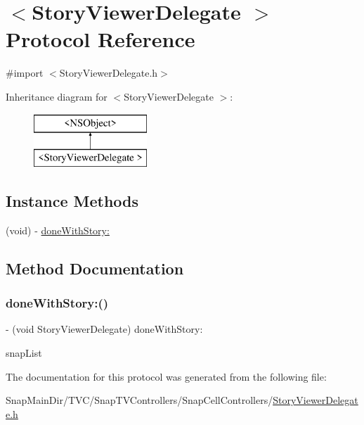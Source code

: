\hypertarget{protocol_story_viewer_delegate_01-p}{}\section{$<$Story\+Viewer\+Delegate $>$ Protocol Reference}
\label{protocol_story_viewer_delegate_01-p}


{\ttfamily \#import $<$Story\+Viewer\+Delegate.\+h$>$}

Inheritance diagram for $<$Story\+Viewer\+Delegate $>$\+:\begin{figure}[H]
\begin{center}
\leavevmode
\includegraphics[height=2.000000cm]{protocol_story_viewer_delegate_01-p}
\end{center}
\end{figure}
\subsection*{Instance Methods}
\begin{DoxyCompactItemize}
\item 
(void) -\/ \hyperlink{protocol_story_viewer_delegate_01-p_a045f44f8083961a2b2c7593eae0577e7}{done\+With\+Story\+:}
\end{DoxyCompactItemize}


\subsection{Method Documentation}
\hypertarget{protocol_story_viewer_delegate_01-p_a045f44f8083961a2b2c7593eae0577e7}{}\label{protocol_story_viewer_delegate_01-p_a045f44f8083961a2b2c7593eae0577e7} 
\subsubsection{\texorpdfstring{done\+With\+Story\+:()}{doneWithStory:()}}
{\footnotesize\ttfamily -\/ (void Story\+Viewer\+Delegate) done\+With\+Story\+: \begin{DoxyParamCaption}\item[{(N\+S\+Set$<$ \hyperlink{interface_snap}{Snap} $\ast$ $>$ $\ast$)}]{snap\+List }\end{DoxyParamCaption}}



The documentation for this protocol was generated from the following file\+:\begin{DoxyCompactItemize}
\item 
Snap\+Main\+Dir/\+T\+V\+C/\+Snap\+T\+V\+Controllers/\+Snap\+Cell\+Controllers/\hyperlink{_story_viewer_delegate_8h}{Story\+Viewer\+Delegate.\+h}\end{DoxyCompactItemize}
